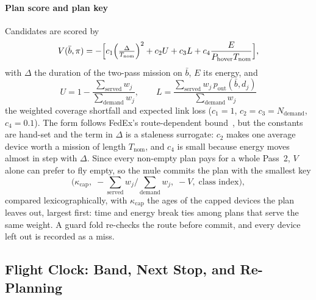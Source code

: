 \documentclass[conference]{IEEEtran}
\newcommand{\bbar}{\bar{b}}
\newcommand{\Tnom}{T_{\mathrm{nom}}}
\begin{document}
\paragraph{Plan score and plan key}
Candidates are scored by
\begin{equation}
V(\bbar,\pi)=-\Bigl[c_1\Bigl(\tfrac{\Delta}{\Tnom}\Bigr)^{2}+c_2U+c_3L+c_4\frac{E}{P_{\mathrm{hover}}\Tnom}\Bigr],
\label{eq:planscore}
\end{equation}
with $\Delta$ the duration of the two-pass mission on $\bbar$, $E$ its energy, and
\begin{equation}
U=1-\frac{\sum_{\text{served}}w_j}{\sum_{\text{demand}}w_j},
\qquad
L=\frac{\sum_{\text{served}}w_j\,p_{\mathrm{out}}(\bbar,d_j)}{\sum_{\text{demand}}w_j}
\end{equation}
the weighted coverage shortfall and expected link loss ($c_1=1$,
$c_2=c_3=N_{\mathrm{demand}}$, $c_4=0.1$). The form follows FedEx's
route-dependent bound~\cite{bian2025indirect}, but the constants are hand-set and
the term in $\Delta$ is a staleness surrogate: $c_2$ makes one average device worth
a mission of length $\Tnom$, and $c_4$ is small because energy moves almost in
step with $\Delta$. Since every non-empty plan pays
for a whole Pass~2, $V$ alone can prefer to fly empty, so the mule commits the
plan with the smallest key
\begin{equation}
\bigl(\kappa_{\mathrm{cap}},\;-\textstyle\sum_{\text{served}}w_j/\sum_{\text{demand}}w_j,\;-V,\;\text{class index}\bigr),
\label{eq:plankey}
\end{equation}
compared lexicographically, with $\kappa_{\mathrm{cap}}$ the ages of the capped
devices the plan leaves out, largest first: time and energy break ties among
plans that serve the same weight. A guard fold re-checks the route before
commit, and every device left out is recorded as a miss.

\subsection{Flight Clock: Band, Next Stop, and Re-Planning}
\label{sec:method:flight}
\end{document}
